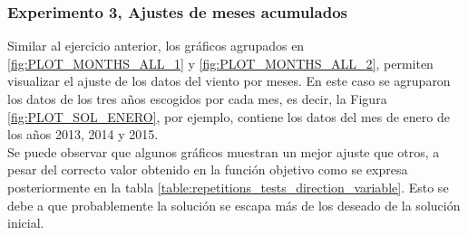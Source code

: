 \subsubsection{Experimento 3, Ajustes de meses acumulados}
Similar al ejercicio anterior, los gráficos agrupados en \ref{fig:PLOT_MONTHS_ALL_1} y \ref{fig:PLOT_MONTHS_ALL_2}, permiten visualizar el ajuste de los datos del viento por meses. En este caso se agruparon los datos de los tres años escogidos por cada mes, es decir, la Figura \ref{fig:PLOT_SOL_ENERO}, por ejemplo, contiene los datos del mes de enero de los años 2013, 2014 y 2015.\\
Se puede observar que algunos gráficos muestran un mejor ajuste que otros, a pesar del correcto valor obtenido en la función objetivo como se expresa posteriormente en la tabla \ref{table:repetitions_tests_direction_variable}. Esto se debe a que probablemente la solución se escapa más de los deseado de la solución inicial. 
